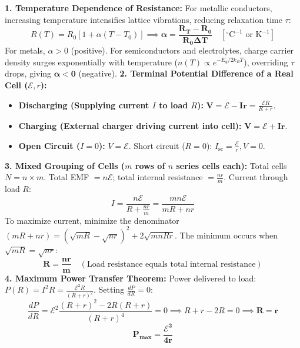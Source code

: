 \documentclass[10pt,a4paper]{article}
\begin{document}
\begin{formulabox}
\textbf{1. Temperature Dependence of Resistance:}
For metallic conductors, increasing temperature intensifies lattice vibrations, reducing relaxation time $\tau$:
\begin{equation}
  R(T) = R_0 [1 + \alpha (T - T_0)] \implies \mathbf{\alpha = \frac{R_T - R_0}{R_0 \Delta T}} \quad [^\circ\mathrm{C}^{-1} \text{ or } \mathrm{K}^{-1}]
\end{equation}
For metals, $\alpha > 0$ (positive). For semiconductors and electrolytes, charge carrier density surges exponentially with temperature ($n(T) \propto e^{-E_g / 2k_B T}$), overriding $\tau$ drops, giving $\mathbf{\alpha < 0}$ (negative).
\textbf{2. Terminal Potential Difference of a Real Cell ($\mathcal{E}, r$):}
\begin{itemize}
  \item \textbf{Discharging (Supplying current $I$ to load $R$):} $\mathbf{V = \mathcal{E} - I r} = \frac{\mathcal{E} R}{R + r}$.
  \item \textbf{Charging (External charger driving current into cell):} $\mathbf{V = \mathcal{E} + I r}$.
  \item \textbf{Open Circuit ($I=0$):} $V = \mathcal{E}$. Short circuit ($R=0$): $I_{\text{sc}} = \frac{\mathcal{E}}{r}, V = 0$.
\end{itemize}
\textbf{3. Mixed Grouping of Cells ($m$ rows of $n$ series cells each):}
Total cells $N = n \times m$. Total EMF $= n\mathcal{E}$; total internal resistance $= \frac{n r}{m}$.
Current through load $R$:
\begin{equation}
  I = \frac{n\mathcal{E}}{R + \frac{n r}{m}} = \frac{m n \mathcal{E}}{m R + n r}
\end{equation}
To maximize current, minimize the denominator $(mR + nr) = (\sqrt{mR} - \sqrt{nr})^2 + 2\sqrt{mnRr}$.
The minimum occurs when $\sqrt{mR} = \sqrt{nr}$:
\begin{equation}
  \mathbf{R = \frac{n r}{m}} \quad (\text{Load resistance equals total internal resistance})
\end{equation}
\textbf{4. Maximum Power Transfer Theorem:}
Power delivered to load: $P(R) = I^2 R = \frac{\mathcal{E}^2 R}{(R + r)^2}$. Setting $\frac{dP}{dR} = 0$:
\begin{equation}
  \frac{dP}{dR} = \mathcal{E}^2 \frac{(R + r)^2 - 2R(R + r)}{(R + r)^4} = 0 \implies R + r - 2R = 0 \implies \mathbf{R = r}
\end{equation}
\begin{equation}
  \mathbf{P_{\max} = \frac{\mathcal{E}^2}{4r}}
\end{equation}
\end{formulabox}
\end{document}
